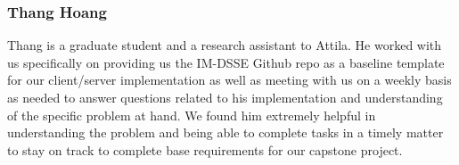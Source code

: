 \subsubsection{Thang Hoang}
Thang is a graduate student and a research assistant to Attila. He worked with us specifically on providing us the IM-DSSE Github repo as a baseline template for our client/server implementation as well as meeting with us on a weekly basis as needed to answer questions related to his implementation and understanding of the specific problem at hand. We found him extremely helpful in understanding the problem and being able to complete tasks in a timely matter to stay on track to complete base requirements for our capstone project.
